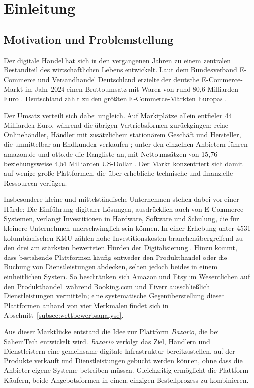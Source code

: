 \chapter{Einleitung}
\label{chap:einleitung}

\section{Motivation und Problemstellung}
\label{sec:motivation}

Der digitale Handel hat sich in den vergangenen Jahren zu einem
zentralen Bestandteil des wirtschaftlichen Lebens entwickelt. Laut dem
Bundesverband E-Commerce und Versandhandel Deutschland erzielte der
deutsche E-Commerce-Markt im Jahr 2024 einen Bruttoumsatz mit Waren
von rund 80,6 Milliarden Euro \cite{bevh_2025}. Deutschland zählt zu
den größten E-Commerce-Märkten Europas
\cite{trade_gov_germany_ecommerce}.

Der Umsatz verteilt sich dabei ungleich. Auf Marktplätze allein
entfielen 44 Milliarden Euro, während die übrigen Vertriebsformen
zurückgingen: reine Onlinehändler, Händler mit zusätzlichem
stationärem Geschäft und Hersteller, die unmittelbar an Endkunden
verkaufen \cite{bevh_2025};
unter den einzelnen Anbietern führen amazon.de und otto.de die
Rangliste an, mit Nettoumsätzen von 15,76 beziehungsweise 4,54
Milliarden US-Dollar \cite{trade_gov_germany_ecommerce}. Der Markt
konzentriert sich damit auf wenige große Plattformen, die über
erhebliche technische und finanzielle Ressourcen verfügen.

Insbesondere kleine und mittelständische Unternehmen stehen dabei vor
einer Hürde: Die Einführung digitaler Lösungen, ausdrücklich auch von
E-Commerce-Systemen, verlangt Investitionen in Hardware, Software und
Schulung, die für kleinere Unternehmen unerschwinglich sein können. In
einer Erhebung unter 4531 kolumbianischen KMU zählen hohe
Investitionskosten branchenübergreifend zu den drei am stärksten
bewerteten Hürden der Digitalisierung
\cite{digitalization_barrier_smes}. Hinzu kommt, dass bestehende
Plattformen häufig entweder den Produkthandel oder die Buchung von
Dienstleistungen abdecken, selten jedoch beides in einem einheitlichen
System. So beschränken sich Amazon und Etsy im Wesentlichen auf den
Produkthandel, während Booking.com und Fiverr ausschließlich
Dienstleistungen vermitteln; eine systematische Gegenüberstellung
dieser Plattformen anhand von vier Merkmalen findet sich in
Abschnitt~\ref{subsec:wettbewerbsanalyse}.

Aus dieser Marktlücke entstand die Idee zur Plattform
\textit{Bazario}, die bei SahemTech entwickelt wird. \textit{Bazario}
verfolgt das Ziel, Händlern und Dienstleistern eine gemeinsame
digitale Infrastruktur bereitzustellen, auf der Produkte verkauft und
Dienstleistungen gebucht werden können, ohne dass die Anbieter eigene
Systeme betreiben müssen. Gleichzeitig ermöglicht die Plattform
Käufern, beide Angebotsformen in einem einzigen Bestellprozess zu
kombinieren.

